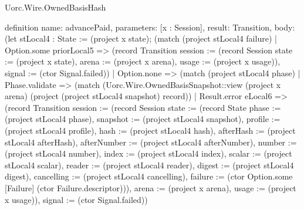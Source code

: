 \begin{lexlean}{Uorc.Wire.OwnedBasisHash}
\begin{semanticmodule}
definition{
  name: advancePaid,
  parameters: [x : Session],
  result: Transition,
  body: (let stLocal4 : State := (project x state); (match (project stLocal4 failure)
    | Option.some priorLocal5 => (record Transition {session := (record Session {state := (project x state), arena := (project x arena), usage := (project x usage)}), signal := (ctor Signal.failed)})
    | Option.none => (match (project stLocal4 phase)
      | Phase.validate => (match (Uorc.Wire.OwnedBasisSnapshot::view (project x arena) (project (project stLocal4 snapshot) record))
        | Result.error eLocal6 => (record Transition {session := (record Session {state := (record State {phase := (project stLocal4 phase), snapshot := (project stLocal4 snapshot), profile := (project stLocal4 profile), hash := (project stLocal4 hash), afterHash := (project stLocal4 afterHash), afterNumber := (project stLocal4 afterNumber), number := (project stLocal4 number), index := (project stLocal4 index), scalar := (project stLocal4 scalar), reader := (project stLocal4 reader), digest := (project stLocal4 digest), cancelling := (project stLocal4 cancelling), failure := (ctor Option.some [Failure] (ctor Failure.descriptor))}), arena := (project x arena), usage := (project x usage)}), signal := (ctor Signal.failed)})
}
\end{semanticmodule}
\end{lexlean}

